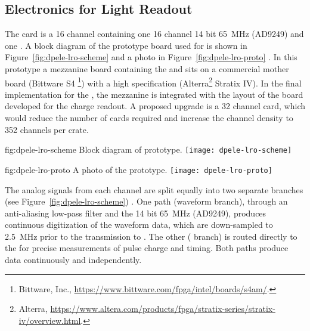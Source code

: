 \subsection{Electronics for Light Readout}
\label{sec:fddp-tpc-elec-design-lro}
%
The  card is a \num{16} channel  containing one \num{16} channel \num{14} bit \SI{65}{\MHz}  (AD9249) and one  . A block diagram of the prototype board used for  is shown in Figure~\ref{fig:dpele-lro-scheme} and a photo in Figure~\ref{fig:dpele-lro-proto} . In this prototype a mezzanine board containing the  and  sits on a commercial mother board (Bittware S4 \footnote{Bittware\texttrademark{}, Inc., \url{https://www.bittware.com/fpga/intel/boards/s4am/}.}) with a high specification  (Alterra\footnote{Alterra\texttrademark{}, \url{https://www.altera.com/products/fpga/stratix-series/stratix-iv/overview.html}.} Stratix IV). In the final implementation for the , the mezzanine is integrated with the layout of the  board developed for the charge readout.  
A proposed upgrade is a \num{32} channel card, %
which would reduce the number of cards required and increase the channel density to \num{352} channels per  crate.

\begin{dunefigure}{fig:dpele-lro-scheme}
{Block diagram of  prototype.}
\texttt{[image: dpele-lro-scheme]}
\end{dunefigure}

\begin{dunefigure}{fig:dpele-lro-proto}
{A photo of the  prototype.}
\texttt{[image: dpele-lro-proto]}
\end{dunefigure}

The analog signals from each  channel are split equally into two separate branches (see Figure~\ref{fig:dpele-lro-scheme}) . One path (waveform branch), through an anti-aliasing low-pass filter and the \num{14} bit \SI{65}{\MHz}  (AD9249), produces continuous digitization of the  waveform data, which are down-sampled to \SI{2.5}{MHz} prior to the transmission to . The other ( branch) is routed directly to the   for precise measurements of pulse charge and timing. Both paths produce data continuously and independently.


